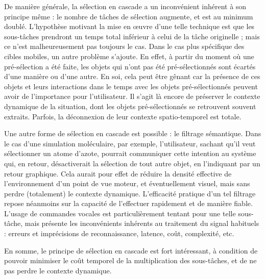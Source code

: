     De manière générale, la sélection en cascade a un inconvénient inhérent à son principe même : le nombre de tâches de sélection augmente, et est au minimum doublé. L'hypothèse motivant la mise en \oe{}uvre d'une telle technique est que les sous-tâches prendront un temps total inférieur à celui de la tâche originelle ; mais ce n'est malheureusement pas toujours le cas. Dans le cas plus spécifique des cibles mobiles, un autre problème s'ajoute. En effet, à partir du moment où une pré-sélection a été faite, les objets qui n'ont pas été pré-sélectionnés sont écartés d'une manière ou d'une autre. En soi, cela peut être gênant car la présence de ces objets et leurs interactions dans le temps avec les objets pré-sélectionnés peuvent avoir de l'importance pour l'utilisateur. Il s'agit là encore de préserver le contexte dynamique de la situation, dont les objets pré-sélectionnés se retrouvent souvent extraits. Parfois, la déconnexion de leur contexte spatio-temporel est totale.
    
	Une autre forme de sélection en cascade est possible : le filtrage sémantique. Dans le cas d'une simulation moléculaire, par exemple, l'utilisateur, sachant qu'il veut sélectionner un atome d'azote, pourrait communiquer cette intention au système qui, en retour, désactiverait la sélection de tout autre objet, en l'indiquant par un retour graphique. Cela aurait pour effet de réduire la densité effective de l'environnement d'un point de vue moteur, et éventuellement visuel, mais sans perdre (totalement) le contexte dynamique. L'efficacité pratique d'un tel filtrage repose néanmoins sur la capacité de l'effectuer rapidement et de manière fiable. L'usage de commandes vocales est particulièrement tentant pour une telle sous-tâche, mais présente les inconvénients inhérents au traitement du signal habituels : erreurs et imprécisions de reconnaissance, latence, coût, complexité, etc.
    
    En somme, le principe de sélection en cascade est fort intéressant, à condition de pouvoir minimiser le coût temporel de la multiplication des sous-tâches, et de ne pas perdre le contexte dynamique.

